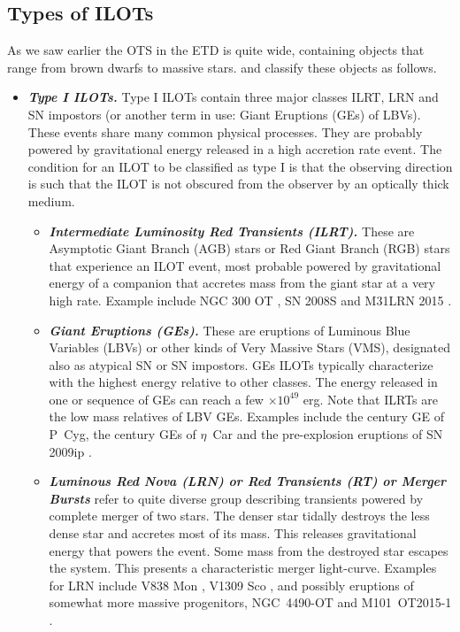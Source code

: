 \documentclass[a4paper,modern]{aastex62}
\newcommand{\emphbf}[1]{\textbf{\emph{#1}}}
\begin{document}
\subsection{Types of ILOTs \label{subsec:Types of ILOTs}}
As we saw earlier the OTS in the ETD is quite wide, containing objects that range from brown dwarfs to massive stars. 
\cite{2016RAA....16...99K} and \cite{2018Galax...6...82K} classify these objects as follows.
\begin{itemize}
\item \emphbf{Type I ILOTs.} Type I ILOTs contain three major classes ILRT, LRN and SN impostors (or another term in use: Giant Eruptions (GEs) of LBVs). These events share many common physical processes. They are probably powered by gravitational energy released in a high accretion rate event. The condition for an ILOT to be classified as type I is that the observing direction is such that the ILOT is not obscured from the observer by an optically thick medium.

\begin{itemize}
\item \emphbf{Intermediate Luminosity Red Transients (ILRT).} 
These are Asymptotic Giant Branch (AGB) stars or Red Giant Branch (RGB) stars that experience an ILOT event, most probable powered by gravitational energy of a companion that accretes mass from the giant star at a very high rate. Example include NGC 300 OT \citep{2009ApJ...695L.154B,2010ApJ...709L..11K,2016MNRAS.460.1645A}, SN 2008S and M31LRN 2015 \citep{2008ATel.1550....1P,2009ApJ...697L..49S,2009ApJ...705.1425P,2010MNRAS.403..474W,2016MNRAS.462..217S}.

\item \emphbf{Giant Eruptions (GEs).} These are eruptions of Luminous Blue Variables (LBVs) or other kinds of Very Massive Stars (VMS), designated also as atypical SN or SN impostors. GEs ILOTs typically characterize with the highest energy relative to other classes. The energy released in one or sequence of GEs can reach a few $\times10^{49}$ erg. Note that ILRTs are the low mass relatives of LBV GEs. Examples include the  century GE of P~Cyg, the  century GEs of $\eta$~Car and the pre-explosion eruptions of SN 2009ip \citep{2016MNRAS.463.2904S}. 

\item \label{lrn-ilot-item} \emphbf{Luminous Red Nova (LRN) or Red Transients (RT) or Merger Bursts} refer to quite diverse group describing transients powered by complete merger of two stars. 
The denser star tidally destroys the less dense star and accretes most of its mass. This releases gravitational energy that powers the event. Some mass from the destroyed star escapes the system.
This presents a characteristic merger light-curve. Examples for LRN include V838 Mon \citep{2005A&A...441.1099T}, V1309 Sco \citep{2011A&A...528A.114T}, and possibly eruptions of somewhat more massive progenitors, NGC~4490-OT \citep{2016MNRAS.458..950S} and M101~OT2015-1 \citep{2017ApJ...834..107B}.
\end{itemize}


\end{itemize}
\end{document}
